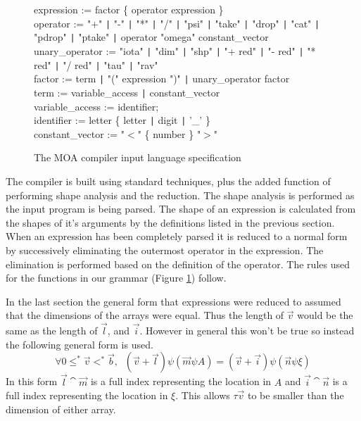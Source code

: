 \begin{figure}
{{expression := factor \{ operator expression \} \\
operator := "+" \verb+|+ "-" \verb+|+ "*" \verb+|+ "/" \verb+|+ "psi" \verb+|+ "take" \verb+|+ "drop" \verb+|+ "cat" \verb+|+ "pdrop" \verb+|+
	"ptake" \verb+|+ operator "omega" constant\_vector \\
unary\_operator := "iota" \verb+|+ "dim" \verb+|+ "shp" \verb+|+ "+ red" \verb+|+ "- red" \verb+|+ "* red" \verb+|+ 
	"/ red" \verb+|+ "tau" \verb+|+ "rav" \\
factor := term  \verb+|+ "(" expression ")" \verb+|+ unary\_operator factor \\
term := variable\_access \verb+|+ constant\_vector \\
variable\_access := identifier; \\
identifier := letter \{ letter \verb+|+ digit \verb+|+ '\_' \} \\
constant\_vector := "$<$" \{ number \} "$>$" \\
}}
\caption{The MOA compiler input language specification}
\label{bnf}
\end{figure}
The compiler is built using standard techniques, plus the added function
of performing shape analysis and the reduction.  The shape analysis is
performed as the input program is being parsed.  The shape of an expression
is calculated from the shapes of it's arguments by the definitions listed
in the previous section.  When an expression has been completely parsed
it is reduced to a normal form by successively eliminating the outermost
operator in the expression.  The elimination is performed based on the
definition of the operator.  The rules used for the functions in our
grammar (Figure \ref{bnf}) follow.

In the last section the general form that expressions were reduced to assumed
that the dimensions of the arrays were equal.  Thus the length of $\vec{v}$
would be the same as the length of $\vec{l}$, and $\vec{i}$.  However
in general this won't be true so instead the following general form is
used.
$$\forall 0\leq^{*}\vec{v}<^{*}\vec{b}, \;\;(\vec{v}+\vec{l})\psi(\vec{m}\psi 
        A)=(\vec{v}+\vec{i})\psi(\vec{n}\psi \xi)$$
In this form $\vec{l}\cat\vec{m}$ is a full index representing the location
in $A$ and $\vec{i}\cat\vec{n}$ is a full  index representing the location
in $\xi$.  This allows $\tau\vec{v}$ to be smaller than the dimension of either
array.


